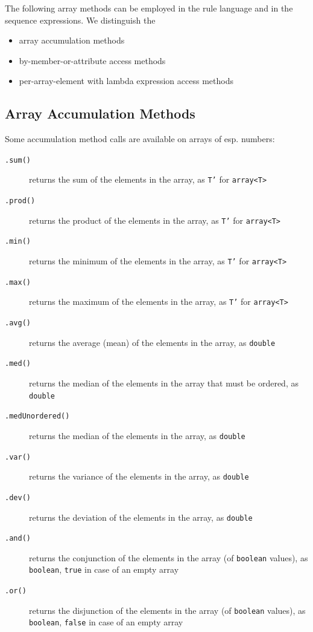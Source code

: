 The following array methods can be employed in the rule language and in the sequence expressions.
We distinguish the 
\begin{itemize}
	\item array accumulation methods
	\item by-member-or-attribute access methods
	\item per-array-element with lambda expression access methods
\end{itemize}

\subsection{Array Accumulation Methods} 

Some accumulation method calls are available on arrays of esp. numbers:

\begin{description}
\item[\texttt{.sum()}] returns the sum of the elements in the array, as \texttt{T'} for \texttt{array<T>}
\item[\texttt{.prod()}] returns the product of the elements in the array, as \texttt{T'} for \texttt{array<T>}
\item[\texttt{.min()}] returns the minimum of the elements in the array, as \texttt{T'} for \texttt{array<T>}
\item[\texttt{.max()}] returns the maximum of the elements in the array, as \texttt{T'} for \texttt{array<T>}
\item[\texttt{.avg()}] returns the average (mean) of the elements in the array, as \texttt{double}
\item[\texttt{.med()}] returns the median of the elements in the array that must be ordered, as \texttt{double}
\item[\texttt{.medUnordered()}] returns the median of the elements in the array, as \texttt{double}
\item[\texttt{.var()}] returns the variance of the elements in the array, as \texttt{double}
\item[\texttt{.dev()}] returns the deviation of the elements in the array, as \texttt{double}
\item[\texttt{.and()}] returns the conjunction of the elements in the array (of \texttt{boolean} values), as \texttt{boolean}, \texttt{true} in case of an empty array
\item[\texttt{.or()}] returns the disjunction of the elements in the array (of \texttt{boolean} values), as \texttt{boolean}, \texttt{false} in case of an empty array
\end{description}\label{arrayaccumulationmethod}

